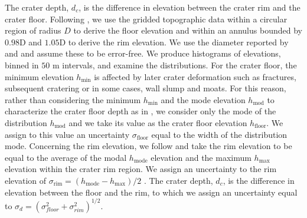 The crater  depth, $d_c$, is  the difference in elevation  between the
crater rim and the  crater floor.  Following \citet{Kalynn:2013fg}, we
use the  gridded topographic data  within a circular region  of radius
$D$ to  derive the floor  elevation and  within an annulus  bounded by
$0.98$D and $1.05$D to derive the  rim elevation.  We use the diameter
reported by \citet{Head:2010fy}  and \citet{Jozwiak:2012dq} and assume
these to be error-free. We produce histograms of elevations, binned in
$50$  m intervals,  and  examine the  distributions.   For the  crater
floor,  the minimum  elevation $h_{\text{min}}$  is affected  by later
crater deformation such as fractures,  subsequent cratering or in some
cases, wall slump and moats.  For this reason, rather than considering
the minimum  $h_{\text{min}}$ and the mode  elevation $h_{\text{mod}}$
to characterize the crater floor depth as in \citet{Kalynn:2013fg}, we
consider only  the mode  of the  distribution $h_{\text{mod}}$  and we
take its value  as the crater floor  elevation $h_{\text{floor}}$.  We
assign to  this value an uncertainty  $\sigma_{\text{floor}}$ equal to
the width of the distribution  mode.  Concerning the rim elevation, we
follow \citet{Kalynn:2013fg} and take the rim elevation to be equal to
the average of  the modal $h_{\text{mode}}$ elevation  and the maximum
$h_{\text{max}}$ elevation within the crater rim region.  We assign an
uncertainty        to        the        rim        elevation        of
$\sigma_{\text{rim}}=(h_{\text{mode}}-h_{\text{max}})/2$
\citep{Kalynn:2013fg}.  The crater depth,  $d_c$, is the difference in
elevation  between the  floor  and  the rim,  to  which  we assign  an
uncertainty                          equal                          to
$\sigma_{d}=(\sigma_{floor}^2+\sigma_{rim}^2)^{1/2}$.

